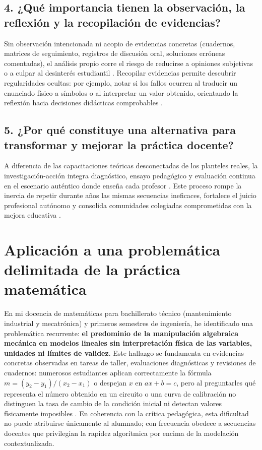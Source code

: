 \documentclass[spanish,letterpaper,oneside]{article}
\begin{document}
\subsection*{4. ¿Qué importancia tienen la observación, la reflexión y la recopilación de evidencias?}
Sin observación intencionada ni acopio de evidencias concretas (cuadernos, matrices de seguimiento, registros de discusión oral, soluciones erróneas comentadas), el análisis propio corre el riesgo de reducirse a opiniones subjetivas o a culpar al desinterés estudiantil \citep{restrepo2004investigacion}. Recopilar evidencias permite descubrir regularidades ocultas: por ejemplo, notar si los fallos ocurren al traducir un enunciado físico a símbolos o al interpretar un valor obtenido, orientando la reflexión hacia decisiones didácticas comprobables \citep{eef2021feedback,bostrom2023formative}.

\subsection*{5. ¿Por qué constituye una alternativa para transformar y mejorar la práctica docente?}
A diferencia de las capacitaciones teóricas desconectadas de los planteles reales, la investigación-acción integra diagnóstico, ensayo pedagógico y evaluación continua en el escenario auténtico donde enseña cada profesor \citep{restrepo2004investigacion}. Este proceso rompe la inercia de repetir durante años las mismas secuencias ineficaces, fortalece el juicio profesional autónomo y consolida comunidades colegiadas comprometidas con la mejora educativa \citep{quiroga2022aprendizaje}.

\section{Aplicación a una problemática delimitada de la práctica matemática}
En mi docencia de matemáticas para bachillerato técnico (mantenimiento industrial y mecatrónica) y primeros semestres de ingeniería, he identificado una problemática recurrente: \textbf{el predominio de la manipulación algebraica mecánica en modelos lineales sin interpretación física de las variables, unidades ni límites de validez}. Este hallazgo se fundamenta en evidencias concretas observadas en tareas de taller, evaluaciones diagnósticas y revisiones de cuadernos: numerosos estudiantes aplican correctamente la fórmula $m = (y_2-y_1)/(x_2-x_1)$ o despejan $x$ en $ax + b = c$, pero al preguntarles qué representa el número obtenido en un circuito o una curva de calibración no distinguen la tasa de cambio de la condición inicial ni detectan valores físicamente imposibles \citep{star2015algebra}. En coherencia con la crítica pedagógica, esta dificultad no puede atribuirse únicamente al alumnado; con frecuencia obedece a secuencias docentes que privilegian la rapidez algorítmica por encima de la modelación contextualizada.
\end{document}
